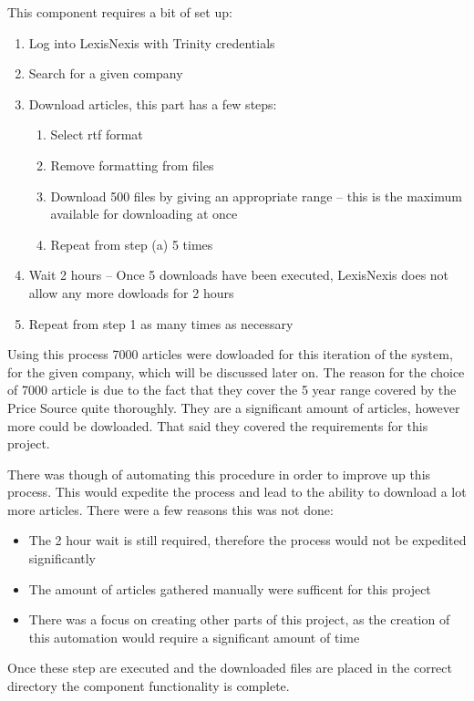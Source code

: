 This component requires a bit of set up:
\begin{enumerate}
    \item Log into LexisNexis with Trinity credentials
    \item Search for a given company
    \item Download articles, this part has a few steps:
    \begin{enumerate}
        \item Select rtf format
        \item Remove formatting from files
        \item Download 500 files by giving an appropriate range -- this is the maximum available for downloading at once
        \item Repeat from step (a) 5 times
    \end{enumerate}
    \item Wait 2 hours -- Once 5 downloads have been executed, LexisNexis does not allow any more dowloads for 2 hours
    \item Repeat from step 1 as many times as necessary
\end{enumerate}
Using this process 7000 articles were dowloaded for this iteration of the system, for the given company, which will be discussed later on. The reason for the choice of 7000 article is due to the fact that they cover the 5 year range covered by the Price Source quite thoroughly. They are a significant amount of articles, however more could be dowloaded. That said they covered the requirements for this project.

There was though of automating this procedure in order to improve up this process. This would expedite the process and lead to the ability to download a lot more articles. There were a few reasons this was not done:
\begin{itemize}
    \item The 2 hour wait is still required, therefore the process would not be expedited significantly
    \item The amount of articles gathered manually were sufficent for this project
    \item There was a focus on creating other parts of this project, as the creation of this automation would require a significant amount of time
\end{itemize}

Once these step are executed and the downloaded files are placed in the correct directory the component functionality is complete.

